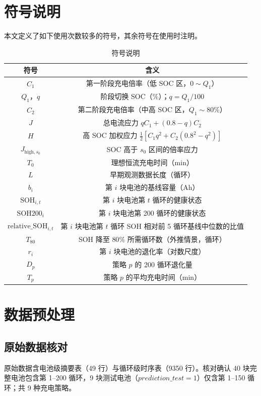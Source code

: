 \documentclass[withoutpreface,bwprint]{cumcmthesis}
\begin{document}
\section{符号说明}
本文定义了如下使用次数较多的符号，其余符号在使用时注明。
\begin{longtable}{cc}
	\caption{符号说明}\label{tab:symbols} \\
	\toprule[1.5pt]
	符号 & 含义\\
	\midrule[1pt]
	$C_1$ & 第一阶段充电倍率（低 SOC 区，$0\sim Q_1$）\\
	$Q_1$，$q$ & 阶段切换 SOC（$\%$）；$q=Q_1/100$\\
	$C_2$ & 第二阶段充电倍率（中高 SOC 区，$Q_1\sim80\%$）\\
	$J$ & 总电流应力 $qC_1+(0.8-q)C_2$\\
	$H$ & 高 SOC 加权应力 $\frac12[C_1q^2+C_2(0.8^2-q^2)]$\\
	$J_{\mathrm{high},s_0}$ & SOC 高于 $s_0$ 区间的倍率应力\\
	$T_0$ & 理想恒流充电时间（min）\\
	$L$ & 早期观测数据长度（循环）\\
	$b_i$ & 第 $i$ 块电池的基线容量（Ah）\\
	$\mathrm{SOH}_{i,t}$ & 第 $i$ 块电池第 $t$ 循环的健康状态\\
	$\mathrm{SOH200}_i$ & 第 $i$ 块电池第 200 循环的健康状态\\
	$\mathrm{relative\_SOH}_{i,t}$ & 第 $i$ 块电池第 $t$ 循环 SOH 相对前 5 循环基线中位数的比值\\
	$T_{80}$ & SOH 降至 $80\%$ 所需循环数（外推情景，循环）\\
	$r_i$ & 第 $i$ 块电池的退化率（对数尺度）\\
	$D_p$ & 策略 $p$ 的 200 循环退化量\\
	$T_p$ & 策略 $p$ 的平均充电时间（min）\\
	\bottomrule[1.5pt]
\end{longtable}

\section{数据预处理}
\subsection{原始数据核对}
原始数据含电池级摘要表（49 行）与循环级时序表（9350 行）。核对确认 40 块完整电池包含第 1--200 循环，9 块测试电池（$prediction\_test=1$）仅含第 1--150 循环；共 9 种充电策略。
\end{document}
